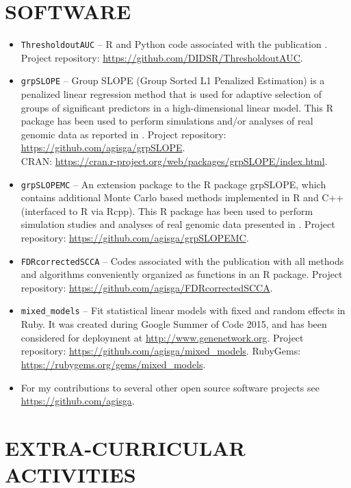 \documentclass[overlapped, line, 10pt]{res} %
\begin{document}
\begin{resume}

\section{SOFTWARE}

\begin{itemize}
  \item \verb!ThresholdoutAUC! -- R and Python code associated with the publication \cite{Gossmann2021-bp}. Project repository: \url{https://github.com/DIDSR/ThresholdoutAUC}.
  \item \verb!grpSLOPE! -- Group SLOPE (Group Sorted L1 Penalized Estimation) is a penalized linear regression method that is used for adaptive selection of groups of significant predictors in a high-dimensional linear model. This R package has been used to perform simulations and/or analyses of real genomic data as reported in \cite{Gossmann2017-yu, brzyski2016}. Project repository: \url{https://github.com/agisga/grpSLOPE}.\\
    CRAN: \url{https://cran.r-project.org/web/packages/grpSLOPE/index.html}.
  \item \verb!grpSLOPEMC! -- An extension package to the R package grpSLOPE, which contains additional Monte Carlo based methods implemented in R and C++ (interfaced to R via Rcpp). This R package has been used to perform simulation studies and analyses of real genomic data presented in \cite{Gossmann2017-yu}. Project repository: \url{https://github.com/agisga/grpSLOPEMC}.
  \item \verb!FDRcorrectedSCCA! -- Codes associated with the publication \cite{Gossmann2017-ln} with all methods and algorithms conveniently organized as functions in an R package. Project repository: \url{https://github.com/agisga/FDRcorrectedSCCA}.
  \item \verb!mixed_models! -- Fit statistical linear models with fixed and random effects in Ruby. It was created during Google Summer of Code 2015, and has been considered for deployment at \url{http://www.genenetwork.org}. Project repository: \url{https://github.com/agisga/mixed_models}. RubyGems: \url{https://rubygems.org/gems/mixed_models}.
  \item For my contributions to several other open source software projects see \url{https://github.com/agisga}.
\end{itemize}


\section{EXTRA-CURRICULAR ACTIVITIES}


\end{resume}
\end{document}

